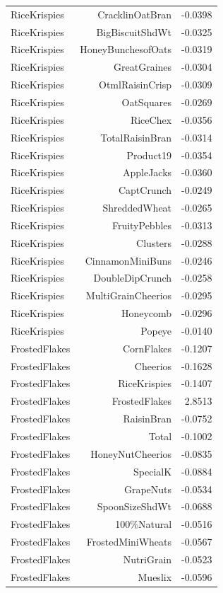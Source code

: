 \begin{longtable}{@{}lrr@{}}
RiceKrispies & CracklinOatBran & -0.0398 \\
RiceKrispies & BigBiscuitShdWt & -0.0325 \\
RiceKrispies & HoneyBunchesofOats & -0.0319 \\
RiceKrispies & GreatGraines & -0.0304 \\
RiceKrispies & OtmlRaisinCrisp & -0.0309 \\
RiceKrispies & OatSquares & -0.0269 \\
RiceKrispies & RiceChex & -0.0356 \\
RiceKrispies & TotalRaisinBran & -0.0314 \\
RiceKrispies & Product19 & -0.0354 \\
RiceKrispies & AppleJacks & -0.0360 \\
RiceKrispies & CaptCrunch & -0.0249 \\
RiceKrispies & ShreddedWheat & -0.0265 \\
RiceKrispies & FruityPebbles & -0.0313 \\
RiceKrispies & Clusters & -0.0288 \\
RiceKrispies & CinnamonMiniBuns & -0.0246 \\
RiceKrispies & DoubleDipCrunch & -0.0258 \\
RiceKrispies & MultiGrainCheerios & -0.0295 \\
RiceKrispies & Honeycomb & -0.0296 \\
RiceKrispies & Popeye & -0.0140 \\
FrostedFlakes & CornFlakes & -0.1207 \\
FrostedFlakes & Cheerios & -0.1628 \\
FrostedFlakes & RiceKrispies & -0.1407 \\
FrostedFlakes & FrostedFlakes & 2.8513 \\
FrostedFlakes & RaisinBran & -0.0752 \\
FrostedFlakes & Total & -0.1002 \\
FrostedFlakes & HoneyNutCheerios & -0.0835 \\
FrostedFlakes & SpecialK & -0.0884 \\
FrostedFlakes & GrapeNuts & -0.0534 \\
FrostedFlakes & SpoonSizeShdWt & -0.0688 \\
FrostedFlakes & 100\%Natural & -0.0516 \\
FrostedFlakes & FrostedMiniWheats & -0.0567 \\
FrostedFlakes & NutriGrain & -0.0523 \\
FrostedFlakes & Mueslix & -0.0596 \\

\end{longtable}
